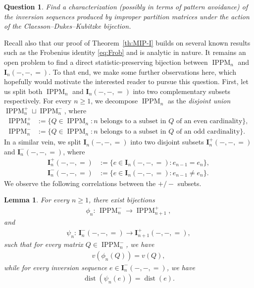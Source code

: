 \documentclass[12pt,reqno]{amsart}
\numberwithin{equation}{section}
\theoremstyle{theorem}
\newtheorem{lemma}[theorem]{Lemma}
\newtheorem{question}[theorem]{Question}
\theoremstyle{definition}
\theoremstyle{named}
\newcommand{\dist}{\operatorname{dist}}
\newcommand{\sw}{v}
\newcommand{\bI}{\mathbf{I}}
\newcommand{\IPPM}{\operatorname{IPPM}}
\begin{document}
\begin{question}
	Find a characterization (possibly in terms of pattern avoidance) of the inversion sequences produced by improper partition matrices under the action of the Claesson--Dukes--Kubitzke bijection.
\end{question}

Recall also that our proof of Theorem~\ref{th:MIP-I} builds on several known results such as the Frobenius identity \eqref{eq:Frob} and is analytic in nature. It remains an open problem to find a direct statistic-preserving bijection between $\IPPM_n$ and $\bI_n(-,-,=)$. To that end, we make some further observations here, which hopefully would motivate the interested reader to pursue this question. First, let us split both $\IPPM_n$ and $\bI_n(-,-,=)$ into two complementary subsets respectively. For every $n\ge 1$, we decompose $\IPPM_n$ as the \emph{disjoint union} $\IPPM_n^{+}\sqcup \IPPM_n^{-}$, where
\begin{align*}
	\IPPM_n^{+} &:= \{Q\in\IPPM_n:\text{$n$ belongs to a subset in $Q$ of an even cardinality}\},\\
	\IPPM_n^{-} &:= \{Q\in\IPPM_n:\text{$n$ belongs to a subset in $Q$ of an odd cardinality}\}.
\end{align*}
In a similar vein, we split $\bI_n(-,-,=)$ into two disjoint subsets $\bI_n^{+}(-,-,=)$ and $\bI_n^{-}(-,-,=)$, where
\begin{align*}
	\bI_n^{+}(-,-,=) &:= \{e\in\bI_n(-,-,=): e_{n-1}=e_n\},\\
	\bI_n^{-}(-,-,=) &:= \{e\in\bI_n(-,-,=): e_{n-1}\neq e_n\}.
\end{align*}
We observe the following correlations between the $+/-$ subsets.

\begin{lemma}\label{lem:even=odd}
	For every $n\ge 1$, there exist bijections
	\begin{align*}
		\phi_n:\,\IPPM_n^- \to \IPPM_{n+1}^+,
	\end{align*}
	and
	\begin{align*}
		\psi_n:\,\bI_n^-(-,-,=) \to \bI_{n+1}^+(-,-,=),
	\end{align*}
	such that for every matrix $Q\in\IPPM_n^-$, we have
	\begin{align}
		\sw(\phi_n(Q))=\sw(Q),\label{eq:sw e=o}
	\end{align}
	while for every inversion sequence $e\in\bI_n^-(-,-,=)$, we have
	\begin{align}
		\dist(\psi_n(e))=\dist(e).\label{eq:dist e=o}
	\end{align}
\end{lemma}
\end{document}
